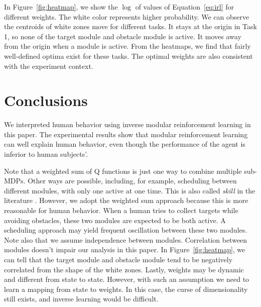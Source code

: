 \documentclass[11pt]{article} %
\begin{document}
In Figure~\ref{fig:heatmap}, we show the $\log$ of values of
Equation~\ref{eq:irl} for different weights. The white color represents higher
probability. We can observe the centroids of white zones move for different
tasks. It stays at the origin in Task 1, so none of the target module and
obstacle module is active. It moves away from the origin when a module is
active.  From the heatmaps, we find that fairly well-defined optima exist for these tasks. The
optimal weights are also consistent with the experiment context.

\section{Conclusions}
\label{sec:conclude}

We interpreted human behavior using inverse modular reinforcement learning in
this paper. The experimental results show that modular reinforcement learning
can well explain human behavior, even though the performance of the agent is
inferior to human subjects'.

Note that a 
weighted sum of Q functions is just one way to combine multiple sub-MDPs. Other ways are possible, including, for example, scheduling between different modules,
with only one active at one time. This is also called {\em skill} in the literature
\cite{konidaris2009skill}. However, we adopt the weighted sum approach
because this is more reasonable for human behavior. When a human tries to collect
targets while avoiding obstacles, these two modules are expected to be both
active. A scheduling approach may yield frequent oscillation between these two
modules. Note also that we assume independence between modules. Correlation between
modules doesn't impair our analysis in this paper. In Figure~\ref{fig:heatmap},
we can tell that the target module and obstacle module tend to be negatively
correlated from the shape of the white zones. Lastly, weights may be dynamic and different from state to state. However, with
such an assumption we need to learn a mapping from state to weights. In this case,
the curse of dimensionality still exists, and inverse learning would be
difficult.



\end{document}
